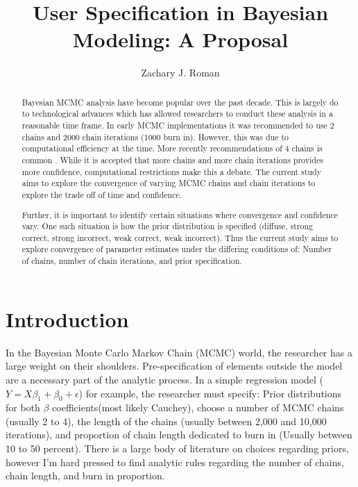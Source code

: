 \documentclass[apa6]{article}
\title{User Specification in Bayesian Modeling: A Proposal}
\author{Zachary J. Roman}
\begin{document}
\maketitle

\begin{abstract}
	Bayesian MCMC analysis have become popular over the past decade. This is largely do to technological advances which has allowed researchers to conduct these analysis in a reasonable time frame. In early MCMC implementations it was recommended to use 2 chains and 2000 chain iterations (1000 burn in). However, this was due to computational efficiency at the time. More recently recommendations of 4 chains is common \cite{plummer2006coda}. While it is accepted that more chains and more chain iterations provides more confidence, computational restrictions make this a debate. The current study aims to explore the convergence of varying MCMC chains and chain iterations to explore the trade off of time and confidence.
	
	Further, it is important to identify certain situations where convergence and confidence vary. One such situation is how the prior distribution is specified (diffuse, strong correct, strong incorrect, weak correct, weak incorrect). Thus the current study aims to explore convergence of parameter estimates under the differing conditions of: Number of chains, number of chain iterations, and prior specification.


\end{abstract}

\section{Introduction}

In the Bayesian Monte Carlo Markov Chain (MCMC) world, the researcher has a large weight on their shoulders. Pre-specification of elements outside the model are a necessary part of the analytic process. In a simple regression model ($Y = X\beta_{1} + \beta_{0} + \epsilon$) for example, the researcher must specify: Prior distributions for both $\beta$ coefficients(most likely Cauchey), choose a number of MCMC chains (usually 2 to 4), the length of the chains (usually between 2,000 and 10,000 iterations), and proportion of chain length dedicated to burn in (Usually between 10 to 50 percent). There is a large body of literature on choices regarding priors, however I'm hard pressed to find analytic rules regarding the number of chains, chain length, and burn in proportion. 
\end{document}
